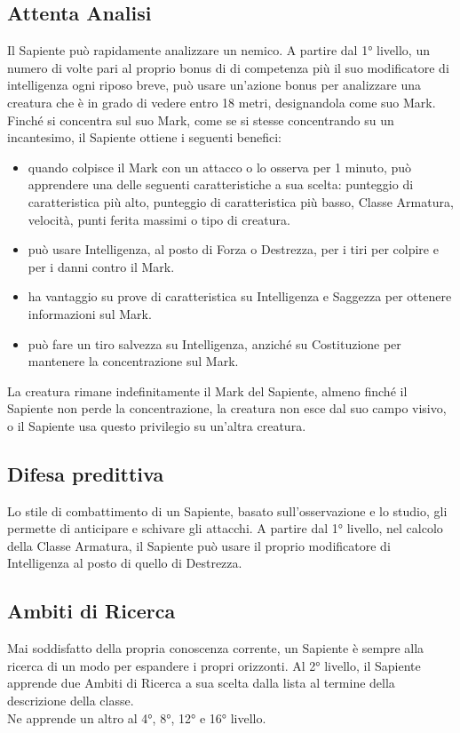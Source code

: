 \subsection{Attenta Analisi}
Il Sapiente può rapidamente analizzare un nemico. A partire dal 1° livello, un numero di volte pari al proprio bonus di di competenza più il suo modificatore di intelligenza ogni riposo breve, può usare un'azione bonus per analizzare una creatura che è in grado di vedere entro 18 metri, designandola come suo Mark. Finché si concentra sul suo Mark, come se si stesse concentrando su un incantesimo, il Sapiente ottiene i seguenti benefici:
\begin{itemize}
\item quando colpisce il Mark con un attacco o lo osserva per 1 minuto, può apprendere una delle seguenti caratteristiche a sua scelta: punteggio di caratteristica più alto, punteggio di caratteristica più basso, Classe Armatura, velocità, punti ferita massimi o tipo di creatura.
\item può usare Intelligenza, al posto di Forza o Destrezza, per i tiri per colpire e per i danni contro il Mark.
\item ha vantaggio su prove di caratteristica su Intelligenza e Saggezza per ottenere informazioni sul Mark.
\item può fare un tiro salvezza su Intelligenza, anziché su Costituzione per mantenere la concentrazione sul Mark.
\end{itemize}
La creatura rimane indefinitamente il Mark del Sapiente, almeno finché il Sapiente non perde la concentrazione, la creatura non esce dal suo campo visivo, o il Sapiente usa questo privilegio su un'altra creatura.

\subsection{Difesa predittiva}
Lo stile di combattimento di un Sapiente, basato sull'osservazione e lo studio, gli permette di anticipare e schivare gli attacchi. A partire dal 1° livello, nel calcolo della Classe Armatura, il Sapiente può usare il proprio modificatore di Intelligenza al posto di quello di Destrezza.

\subsection{Ambiti di Ricerca}
Mai soddisfatto della propria conoscenza corrente, un Sapiente è sempre alla ricerca di un modo per espandere i propri orizzonti. Al 2° livello, il Sapiente apprende due Ambiti di Ricerca a sua scelta dalla lista al termine della descrizione della classe.\\
Ne apprende un altro al 4°, 8°, 12° e 16° livello.

